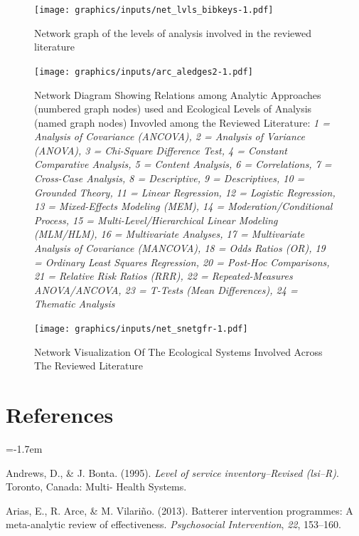 \documentclass[11pt,]{tufte-book}
\newcommand{\refs}{
    \parindent=-1.7em\
    \
    \setlength{\parskip}{0.5\baselineskip}
}
\begin{document}
\newpage

\begin{figure}
\centering
\texttt{[image: graphics/inputs/net\_lvls\_bibkeys-1.pdf]}
\caption{Network graph of the levels of analysis involved in the
reviewed literature\label{fig:keysnet}}
\end{figure}

\newpage

\begin{figure}
\centering
\texttt{[image: graphics/inputs/arc\_aledges2-1.pdf]}
\caption{Network Diagram Showing Relations among Analytic Approaches
(numbered graph nodes) used and Ecological Levels of Analysis (named
graph nodes) Invovled among the Reviewed Literature:
\textit{1 = Analysis of Covariance (ANCOVA), 2 = Analysis of Variance (ANOVA), 3 = Chi-Square Difference Test, 4 = Constant Comparative Analysis, 5 = Content Analysis, 6 = Correlations, 7 = Cross-Case Analysis, 8 = Descriptive, 9 = Descriptives, 10 = Grounded Theory, 11 = Linear Regression, 12 = Logistic Regression, 13 = Mixed-Effects Modeling (MEM), 14 = Moderation/Conditional Process, 15 = Multi-Level/Hierarchical Linear Modeling (MLM/HLM), 16 = Multivariate Analyses, 17 = Multivariate Analysis of Covariance (MANCOVA), 18 = Odds Ratios (OR), 19 = Ordinary Least Squares Regression, 20 = Post-Hoc Comparisons, 21 = Relative Risk Ratios (RRR), 22 = Repeated-Measures ANOVA/ANCOVA, 23 = T-Tests (Mean Differences), 24 = Thematic Analysis}\label{fig:arc_analyses}}
\end{figure}

\newpage

\begin{figure}
\centering
\texttt{[image: graphics/inputs/net\_snetgfr-1.pdf]}
\caption{Network Visualization Of The Ecological Systems Involved Across
The Reviewed Literature\label{fig:sysnet}}
\end{figure}

\chapter{References}\label{references}

\refs

\hypertarget{refs}{}
\hypertarget{ref-andrews1994level}{}
Andrews, D., \& J. Bonta. (1995). \emph{Level of service
inventory--Revised (lsi--R)}. Toronto, Canada: Multi- Health Systems.

\hypertarget{ref-arias2013batterer}{}
Arias, E., R. Arce, \& M. Vilariño. (2013). Batterer intervention
programmes: A meta-analytic review of effectiveness. \emph{Psychosocial
Intervention}, \emph{22}, 153--160.
\end{document}
